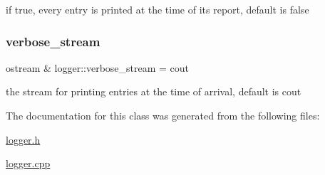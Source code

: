 if true, every entry is printed at the time of its report, default is false 

\mbox{\label{classlogger_aec58cd6310ffb9939f8509daf1fcfbf8}} 
\subsubsection{\texorpdfstring{verbose\+\_\+stream}{verbose\_stream}}
{\footnotesize\ttfamily ostream \& logger\+::verbose\+\_\+stream = cout\hspace{0.3cm}{\ttfamily [static]}}



the stream for printing entries at the time of arrival, default is cout 



The documentation for this class was generated from the following files\+:\begin{DoxyCompactItemize}
\item 
\hyperlink{logger_8h}{logger.\+h}\item 
\hyperlink{logger_8cpp}{logger.\+cpp}\end{DoxyCompactItemize}
